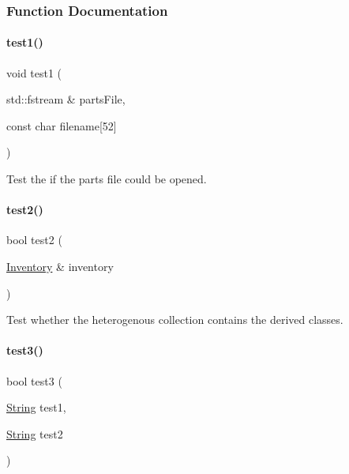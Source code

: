 \subsubsection{Function Documentation}
\mbox{\label{atest_8cpp_acdf8ec90b79eca8d516b03baa19a1b44}} 
\paragraph{\texorpdfstring{test1()}{test1()}}
{\footnotesize\ttfamily void test1 (\begin{DoxyParamCaption}\item[{std\+::fstream \&}]{parts\+File,  }\item[{const char}]{filename\mbox{[}52\mbox{]} }\end{DoxyParamCaption})}



Test the if the parts file could be opened. 

\mbox{\label{atest_8cpp_a4e5e4ea94633fee304b7f4490e655591}} 
\paragraph{\texorpdfstring{test2()}{test2()}}
{\footnotesize\ttfamily bool test2 (\begin{DoxyParamCaption}\item[{\mbox{\hyperlink{class_inventory}{Inventory}} \&}]{inventory }\end{DoxyParamCaption})}



Test whether the heterogenous collection contains the derived classes. 

\mbox{\label{atest_8cpp_a6e6df2af48d16780853d6eddcb8c8bc4}} 
\paragraph{\texorpdfstring{test3()}{test3()}}
{\footnotesize\ttfamily bool test3 (\begin{DoxyParamCaption}\item[{\mbox{\hyperlink{class_string}{String}}}]{test1,  }\item[{\mbox{\hyperlink{class_string}{String}}}]{test2 }\end{DoxyParamCaption})}



